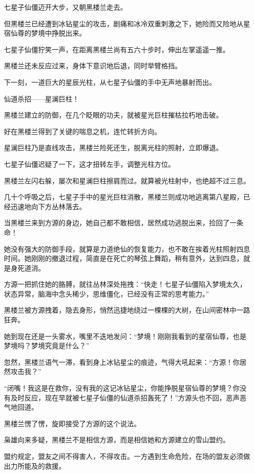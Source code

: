 \begin{this_body}
七星子仙僵迈开大步，又朝黑楼兰走去。

但黑楼兰已经遭到冰钻星尘的攻击，剧痛和冰冷双重刺激之下，她险而又险地从星宿仙尊的梦境中挣脱出来。

七星子仙僵狞笑一声，在距离黑楼兰尚有五六十步时，伸出左掌遥遥一推。

黑楼兰还未反应过来，身体下意识地后退，同时举臂格挡。

下一刻，一道巨大的星辰光柱，从七星子仙僵的手中无声地暴射而出。

仙道杀招——星澜巨柱！

黑楼兰建立的防御，在几个眨眼的功夫，就被星光巨柱摧枯拉朽地击破。

好在黑楼兰得到了关键的喘息之机，连忙转折方向。

星澜巨柱乃是直线攻击，黑楼兰险死还生，脱离光柱的照射，立即爆退。

七星子仙僵迟疑了一下，这才扭转左手，调整光柱方位。

黑楼兰左闪右躲，屡次和星澜巨柱擦肩而过。就算被光柱射中，也绝超不过三息。

几十个呼吸之后，七星子手中的星光巨柱消散，黑楼兰则成功地逃离第八星殿，已经迅速地向下方丛林落去。

当黑楼兰来到方源的身边，她自己都不敢相信，居然成功逃脱出来，捡回了一条命！

她没有强大的防御手段，就算是力道绝仙的恢复能力，也不敢在挨着光柱照射四息时间。她刚刚的撤退过程，简直是在死亡的琴弦上舞蹈，稍有意外，达到四息，就是身死道消。

方源一把抓住她的胳膊，就往丛林深处拖拽：“快走！七星子仙僵陷入梦境太久，状态异常，脑海中念头稀少，思维僵化，已经没有正常的思考能力。”

黑楼兰被方源拽着，隐去身形，悄然迅捷地绕过一棵棵的大树，在山间密林中一路狂奔。

她到现在还是一头雾水，嘴里不迭地发问：“梦境！刚刚我看到的星宿仙尊，也是梦境吗？梦境究竟是什么？”

忽然，黑楼兰语气一滞，看到身上冰钻星尘的痕迹，气得大吼起来：“方源！你居然攻击我？”

“闭嘴！我这是在救你，没有我的这记冰钻星尘，你能挣脱星宿仙尊的梦境？你没有及时反应，现在早就被七星子仙僵的仙道杀招轰死了！”方源头也不回，恶声恶气地回道。

黑楼兰愣了愣，旋即接受了方源的这个说法。

枭雄向来多疑，黑楼兰不是相信方源，而是相信她和方源建立的雪山盟约。

盟约规定，盟友之间不得害人，不得攻击。一方遇到生命危险，在场的盟友必须做出力所能及的救援。


\end{this_body}
